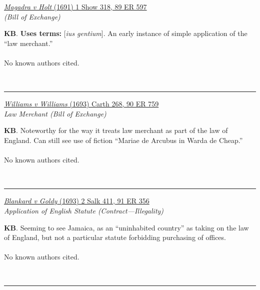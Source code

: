 \documentclass[twoside]{article}
\begin{document}
        \begin{small}
        \begin{center}
        \href{https://heinonline.org/HOL/P?h=hein.engrep/engrf0089&i=601}{\textit{Magadra v Holt} (1691) 1 Show 318, 89 ER 597} \label{1} \\ 
\textit{ (Bill of Exchange)}\\
        \end{center}
        \textbf{KB}.  \textbf{Uses terms: }[\textit{ius gentium}]. An early instance of simple application of the “law merchant.”\\\\No known authors cited.
        \end{small}\\
        \rule{\textwidth}{0.5pt}
        

        \begin{small}
        \begin{center}
        \href{https://heinonline.org/HOL/P?h=hein.engrep/engrf0090&i=763}{\textit{Williams v Williams} (1693) Carth 268, 90 ER 759} \label{4} \\ 
\textit{Law Merchant (Bill of Exchange)}\\
        \end{center}
        \textbf{KB}. Noteworthy for the way it treats law merchant as part of the law of England. Can still see use of fiction “Mariae de Arcubus in Warda de Cheap.”\\\\No known authors cited.
        \end{small}\\
        \rule{\textwidth}{0.5pt}
        

        \begin{small}
        \begin{center}
        \href{https://heinonline.org/HOL/P?h=hein.engrep/engrf0091&i=361}{\textit{Blankard v Goldy} (1693) 2 Salk 411, 91 ER 356} \label{16} \\ 
\textit{Application of English Statute (Contract---Illegality)}\\
        \end{center}
        \textbf{KB}. Seeming to see Jamaica, as an “uninhabited country” as taking on the law of England, but not a particular statute forbidding purchasing of offices.\\\\No known authors cited.
        \end{small}\\
        \rule{\textwidth}{0.5pt}
        
\end{document}
